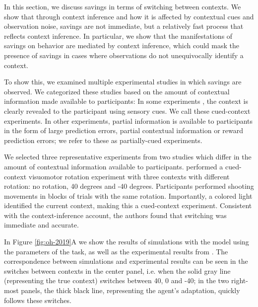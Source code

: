 \documentclass[a4paper,doc,floatsintext,natbib]{apa6}
\def \fref #1{Figure \ref{#1}}     %
\begin{document}
In this section, we discuss savings in terms of switching between contexts. We show that through context inference and how it is affected by contextual cues and observation noise, savings are not immediate, but a relatively fast process that reflects context inference. In particular, we show that the manifestations of savings on behavior are mediated by context inference, which could mask the presence of savings in cases where observations do not unequivocally identify a context.

To show this, we examined multiple experimental studies in which savings are observed. We categorized these studies based on the amount of contextual information made available to participants: In some experiments \citep[e.g.][]{Kim_Neural_2015,Lee_Dual_2009}, the context is clearly revealed to the participant using sensory cues. We call these cued-context experiments. In other experiments, partial information is available to participants \citep[e.g.][]{Davidson_Scaling_2004,Zarahn_Explaining_2008} in the form of large prediction errors, partial contextual information or reward prediction errors; we refer to these as partially-cued experiments.

We selected three representative experiments from two studies \citep{Kim_Neural_2015,Oh_Minimizing_2019} which differ in the amount of contextual information available to participants. \cite{Kim_Neural_2015} performed a cued-context visuomotor rotation experiment with three contexts with different rotation: no rotation, 40 degrees and -40 degrees. Participants performed shooting movements in blocks of trials with the same rotation. Importantly, a colored light identified the current context, making this a cued-context experiment. Consistent with the context-inference account, the authors found that switching was immediate and accurate.

In \fref{fig:oh-2019}A we show the results of simulations with the model using the parameters of the task, as well as the experimental results from \cite{Kim_Neural_2015}. The correspondence between simulations and experimental results can be seen in the switches between contexts in the center panel, i.e. when the solid gray line (representing the true context) switches between 40, 0 and -40; in the two right-most panels, the thick black line, representing the agent's adaptation, quickly follows these switches.
\end{document}
